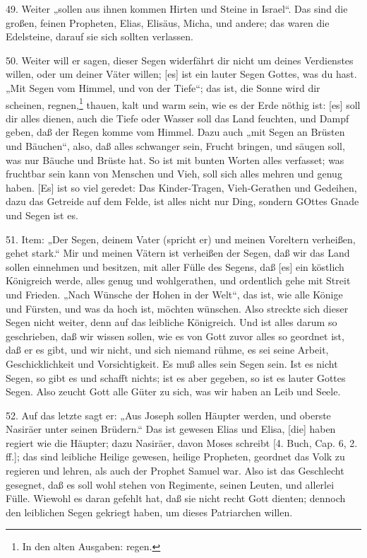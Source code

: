 49. Weiter „sollen aus ihnen kommen Hirten und Steine in Israel“. Das sind die großen, feinen Propheten, Elias, Elisäus, Micha, und andere; das waren die Edelsteine, darauf sie sich sollten verlassen.

50. Weiter will er sagen, dieser Segen widerfährt dir nicht um deines Verdienstes willen, oder um deiner Väter willen; [es] ist ein lauter Segen Gottes, was du hast. „Mit Segen vom Himmel, und von der Tiefe“; das ist, die Sonne wird dir scheinen, regnen,\footnote{In den alten Ausgaben: regen.} thauen, kalt und warm sein, wie es der Erde nöthig ist: [es] soll dir alles dienen, auch die Tiefe oder Wasser soll
das Land feuchten, und Dampf geben, daß der Regen komme vom Himmel. Dazu auch „mit Segen an Brüsten und Bäuchen“, also, daß alles schwanger sein, Frucht bringen, und säugen soll, was nur Bäuche und Brüste hat. So ist mit bunten Worten alles verfasset; was fruchtbar sein kann von Menschen und Vieh, soll sich alles mehren und genug haben. [Es] ist so viel geredet: Das Kinder-Tragen, Vieh-Gerathen und Gedeihen, dazu das Getreide auf dem Felde, ist alles nicht nur Ding, sondern GOttes Gnade und Segen ist es.

51. Item: „Der Segen, deinem Vater (spricht er) und meinen Voreltern verheißen, gehet stark.“ Mir und meinen Vätern ist verheißen der Segen, daß wir das Land sollen einnehmen und besitzen, mit aller Fülle des Segens, daß [es] ein köstlich Königreich werde, alles genug und wohlgerathen, und ordentlich gehe mit Streit und Frieden. „Nach Wünsche der Hohen in der Welt“, das ist, wie alle Könige und Fürsten, und was da hoch ist, möchten wünschen. Also streckte sich dieser Segen nicht weiter, denn auf das leibliche Königreich. Und ist alles darum so geschrieben, daß wir wissen sollen, wie es von Gott zuvor alles so geordnet ist, daß er es gibt, und wir nicht, und sich niemand rühme, es sei seine Arbeit, Geschicklichkeit und Vorsichtigkeit. Es muß alles sein Segen sein. Ist es nicht Segen, so gibt es und schafft nichts; ist es aber gegeben, so ist es lauter Gottes Segen. Also zeucht Gott alle Güter zu sich, was wir haben an Leib und Seele.

52. Auf das letzte sagt er: „Aus Joseph sollen Häupter werden, und oberste Nasiräer unter seinen Brüdern.“ Das ist gewesen Elias und Elisa, [die] haben regiert wie die Häupter; dazu Nasiräer, davon Moses schreibt [4. Buch, Cap. 6, 2. ff.]; das sind leibliche Heilige gewesen, heilige Propheten, geordnet das Volk zu regieren und lehren, als auch der Prophet Samuel war. Also ist das Geschlecht gesegnet, daß es soll wohl stehen von Regimente, seinen Leuten, und allerlei Fülle. Wiewohl es daran gefehlt hat, daß sie nicht recht Gott dienten; dennoch den leiblichen Segen gekriegt haben, um dieses Patriarchen willen.

